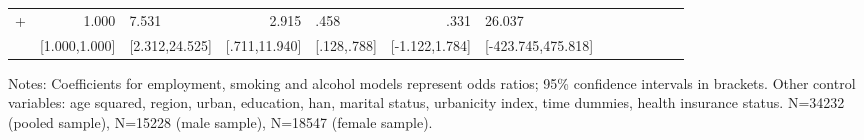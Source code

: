 \begin{table}[h]
\begin{adjustbox}{max width=\linewidth}
\begin{threeparttable}
{\begin{tabular}{l*{6}{D{.}{.}{-1}l}}
+             &           1.000&           7.531&           2.915&            .458&            .331&          26.037\\
                &   [1.000,1.000]&  [2.312,24.525]&   [.711,11.940]&     [.128,.788]&  [-1.122,1.784]&[-423.745,475.818]\\        
\bottomrule
\end{tabular}
\begin{tablenotes}
\item Notes: Coefficients for employment, smoking and alcohol models represent odds ratios;  95\% confidence intervals in brackets.
Other control variables: age squared, region, urban, education, han, marital status, urbanicity index, time dummies, health insurance status. N=34232 (pooled sample), N=15228 (male sample), N=18547 (female sample).
\end{tablenotes}
}
\end{threeparttable}
\end{adjustbox}
\end{table}
\FloatBarrier

\FloatBarrier

\clearpage
